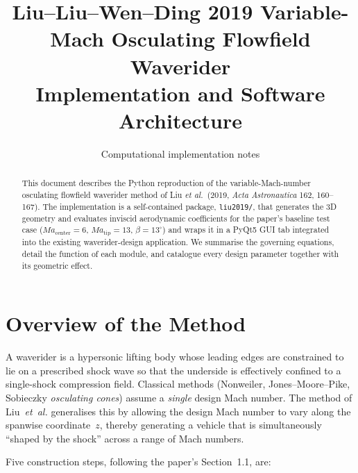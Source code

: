 \documentclass[11pt,a4paper]{article}
\title{\bfseries Liu--Liu--Wen--Ding 2019 Variable-Mach Osculating Flowfield Waverider\\[4pt]
\large Implementation and Software Architecture}
\author{Computational implementation notes}
\date{}
\newcommand{\Ma}{\mathit{Ma}}
\begin{document}
\maketitle

\begin{abstract}
This document describes the Python reproduction of the variable-Mach-number
osculating flowfield waverider method of Liu \textit{et al.}~(2019,
\textit{Acta Astronautica} 162, 160--167). The implementation is a
self-contained package, \texttt{liu2019/}, that generates the 3D geometry
and evaluates inviscid aerodynamic coefficients for the paper's baseline
test case (\mbox{$\Ma_{\mathrm{center}}=6$}, $\Ma_{\mathrm{tip}}=13$,
\mbox{$\beta=13^{\circ}$}) and wraps it in a PyQt5 GUI tab integrated into
the existing waverider-design application. We summarise the governing
equations, detail the function of each module, and catalogue every design
parameter together with its geometric effect.
\end{abstract}

\tableofcontents

\section{Overview of the Method}

A waverider is a hypersonic lifting body whose leading edges are
constrained to lie on a prescribed shock wave so that the underside is
effectively confined to a single-shock compression field. Classical
methods (Nonweiler, Jones--Moore--Pike, Sobieczky \textit{osculating cones})
assume a \emph{single} design Mach number. The method of
Liu~\textit{et~al.} generalises this by allowing the design Mach number
to vary along the spanwise coordinate~$z$, thereby generating a vehicle
that is simultaneously ``shaped by the shock'' across a range of Mach
numbers.

Five construction steps, following the paper's Section~1.1, are:
\end{document}
